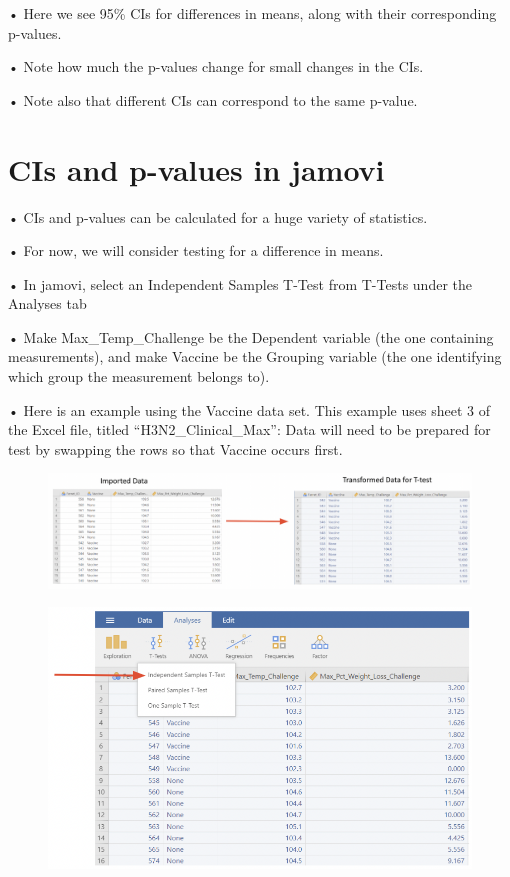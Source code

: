 \documentclass[
  letterpaper,
  DIV=11,
  numbers=noendperiod]{scrreprt}
\begin{document}
• Here we see 95\% CIs for differences in means, along with their
corresponding p-values.

• Note how much the p-values change for small changes in the CIs.

• Note also that different CIs can correspond to the same p-value.

\hypertarget{cis-and-p-values-in-jamovi}{%
\section{CIs and p-values in jamovi}\label{cis-and-p-values-in-jamovi}}

• CIs and p-values can be calculated for a huge variety of statistics.

• For now, we will consider testing for a difference in means.

• In jamovi, select an Independent Samples T-Test from T-Tests under the
Analyses tab

• Make Max\_Temp\_Challenge be the Dependent variable (the one
containing measurements), and make Vaccine be the Grouping variable (the
one identifying which group the measurement belongs to).

• Here is an example using the Vaccine data set. This example uses sheet
3 of the Excel file, titled ``H3N2\_Clinical\_Max'': Data will need to
be prepared for test by swapping the rows so that Vaccine occurs first.

\begin{figure}

{\centering \includegraphics{images/mod1_16.png}

}

\end{figure}

\begin{figure}

{\centering \includegraphics{images/mod1_17.png}

}

\end{figure}
\end{document}
